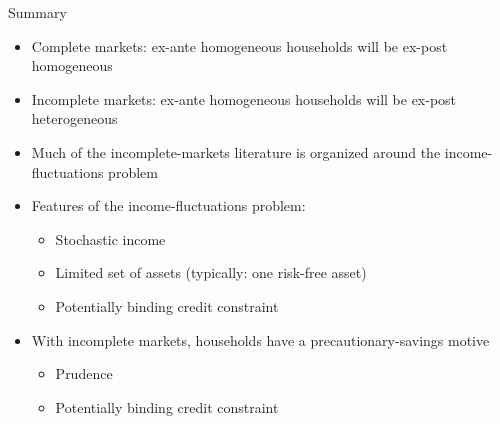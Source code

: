 \documentclass[9pt]{beamer}
\newcommand{\bit}{\begin{itemize}}
\newcommand{\eit}{\end{itemize}}
\newcommand{\ben}{\begin{enumerate}}
\newcommand{\een}{\end{enumerate}}
\begin{document}
\begin{frame}{Summary}

\bit
\setlength\itemsep{1.5em}

\item Complete markets: ex-ante homogeneous households will be ex-post homogeneous

\item Incomplete markets: ex-ante homogeneous households will be ex-post heterogeneous

\item Much of the incomplete-markets literature is organized around the income-fluctuations problem

\item Features of the income-fluctuations problem:
\bit
	\item Stochastic income
	\item Limited set of assets (typically: one risk-free asset)
	\item Potentially binding credit constraint
\eit

\item With incomplete markets, households have a precautionary-savings motive
\bit
	\item Prudence
	
	\item Potentially binding credit constraint
\eit


\eit


\end{frame}


%
%
%
%
%
%
%
%
%
%
%
%
\end{document}
